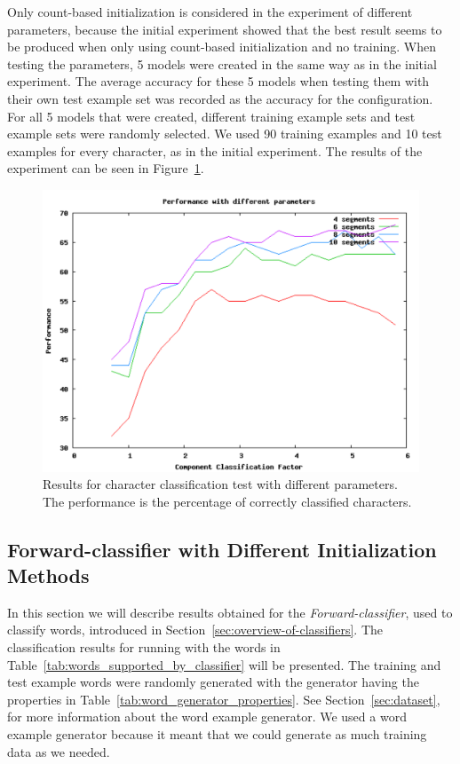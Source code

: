 Only count-based initialization is considered in the experiment of different parameters, because the initial experiment showed that the best result seems to be produced when only using count-based initialization and no training.
When testing the parameters, 5 models were created in the same way as in the initial experiment. 
The average accuracy for these 5 models when testing them with their own test example set was recorded as the accuracy for the configuration. 
For all 5 models that were created, different training example sets and test example sets were randomly selected. 
We used 90 training examples and 10 test examples for every character, as in the initial experiment. 
The results of the experiment can be seen in Figure~\ref{figure:charater-results-parameters}.

\begin{figure}[h!]
\centering
\includegraphics[scale=0.57]{ccf-nos}
\caption{Results for character classification test with different parameters. The performance is the percentage of correctly classified characters.}
\label{figure:charater-results-parameters}
\end{figure}

\subsection{Forward-classifier with Different Initialization Methods}\label{sec:word_classifier_results}
In this section we will describe results obtained for the \emph{Forward-classifier}, used to classify words, introduced in Section~\ref{sec:overview-of-classifiers}.
The classification results for running with the words in Table~\ref{tab:words_supported_by_classifier} will be presented. 
The training and test example words were randomly generated with the generator having the properties in Table~\ref{tab:word_generator_properties}.
See Section~\ref{sec:dataset}, for more information about the word example generator. 
We used a word example generator because it meant that we could generate as much training data as we needed.

